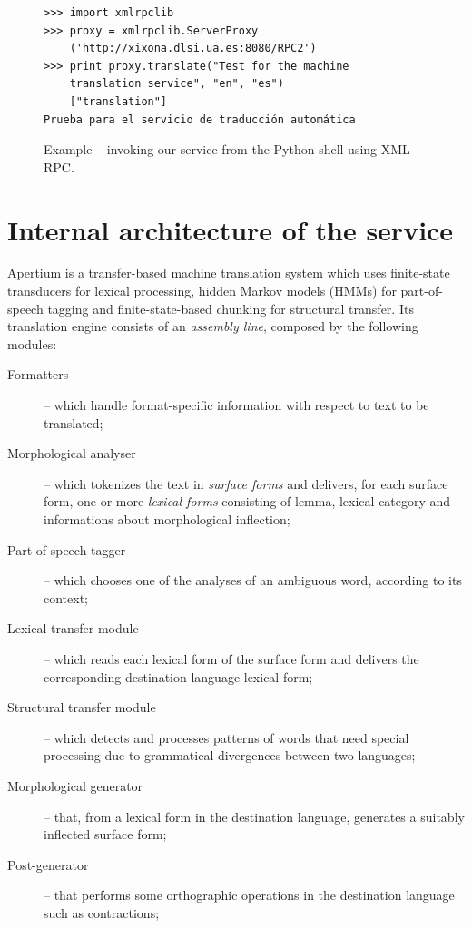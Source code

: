 \documentclass[11pt]{article}
\begin{document}

\begin{figure}
 \begin{Verbatim}[frame=single, fontfamily=courier, fontsize=\scriptsize]
>>> import xmlrpclib
>>> proxy = xmlrpclib.ServerProxy
	('http://xixona.dlsi.ua.es:8080/RPC2')
>>> print proxy.translate("Test for the machine 
	translation service", "en", "es")
	["translation"]
Prueba para el servicio de traducción automática
 \end{Verbatim}
 \caption{Example -- invoking our service from the Python shell using XML-RPC.}
 \label{fig:pythoninv}
\end{figure}


\section{Internal architecture of the service}

Apertium is a transfer-based machine translation system which uses finite-state transducers for lexical processing, hidden Markov models (HMMs) for part-of-speech tagging and finite-state-based chunking for structural transfer. Its translation engine consists of an \emph{assembly line}, composed by the following modules:

\begin{description}
 \item[Formatters] -- which handle format-specific information with respect to text to be translated;
 \item[Morphological analyser] -- which tokenizes the text in \emph{surface forms} and delivers, for each surface form, one or more \emph{lexical forms} consisting of lemma, lexical category and informations about morphological inflection;
 \item[Part-of-speech tagger] -- which chooses one of the analyses of an ambiguous word, according to its context;
 \item[Lexical transfer module] -- which reads each lexical form of the surface form and delivers the corresponding destination language lexical form;
 \item[Structural transfer module] -- which detects and processes patterns of words that need special processing due to grammatical divergences between two languages;
 \item[Morphological generator] -- that, from a lexical form in the destination language, generates a suitably inflected surface form;
 \item[Post-generator] -- that performs some orthographic operations in the destination language such as contractions;
\end{description}
\end{document}
